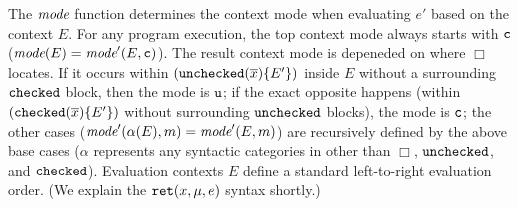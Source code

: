 The $\textit{mode}$ function
determines the context mode when evaluating $e'$ based on the context $E$.
For any program execution, the top context mode always starts with $\texttt{c}$ ($\textit{mode}(E)=\textit{mode}'(E,\texttt{c})$).
The result context mode is depeneded on where $\Box$ locates.
If it occurs within $(\mathtt{unchecked}({\overline{x}})\{E'\})$ inside $E$ without
a surrounding $\mathtt{checked}$ block, then the mode is
$\texttt{u}$; if the exact opposite happens (within $(\mathtt{checked}({\overline{x}}){\{E'\}})$ without surrounding $\mathtt{unchecked}$ blocks),
the mode is $\texttt{c}$; the other cases ($\textit{mode}'(\alpha({E}),m)=\textit{mode}'(E,m)$) are recursively defined by the above base cases ($\alpha$ represents any syntactic categories in  other than $\Box$, $\mathtt{unchecked}$, and $\mathtt{checked}$).
Evaluation contexts $E$ define a standard left-to-right evaluation order. (We explain the
$\mathtt{ret}({x},{\mu},{e})$ syntax shortly.)

